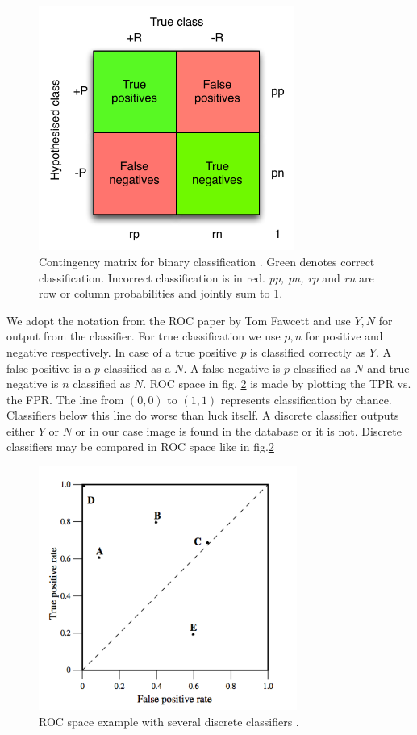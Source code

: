 \documentclass[english,12pt,a4paper,pdftex,elec,utf8, table]{aaltothesis}
\begin{document}
\begin{figure}[htb]
\begin{center}
\includegraphics[height=8cm]{figures/confusion}
\end{center}
\caption{Contingency matrix for binary classification \cite{Fawcett2006}. Green denotes correct classification. Incorrect classification is in red. \emph{pp, pn, rp} and \emph{rn} are row or column probabilities and jointly sum to 1.}
\label{figconfusion}
\end{figure}

We adopt the notation from the ROC paper by Tom Fawcett and use ${Y,N}$ for output from the classifier. For true classification we use ${p,n}$ for positive and negative respectively. In case of a true positive $p$ is classified correctly as $Y$. A false positive is a $p$ classified as a $N$. A false negative is $p$ classified as $N$ and true negative is $n$ classified as $N$. ROC space in fig. \ref{figrocspace} is made by plotting the TPR vs. the FPR. The line from $(0,0)$ to $(1,1)$ represents classification by chance. Classifiers below this line do worse than luck itself. A discrete classifier outputs either $Y$ or $N$ or in our case image is found in the database or it is not. Discrete classifiers may be compared in ROC space like in fig.\ref{figrocspace} \cite{Fawcett2006}

\begin{figure}[htb]
\begin{center}
\includegraphics[height=8cm]{figures/ROC}
\end{center}
\caption{ROC space example with several discrete classifiers \cite{Fawcett2006}. }
\label{figrocspace}
\end{figure}
\end{document}
